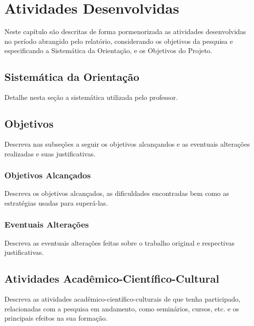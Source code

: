 \chapter{Atividades Desenvolvidas}

Neste capítulo são descritas de forma pormenorizada as atividades desenvolvidas no período abrangido pelo relatório, considerando os objetivos da pesquisa e especificando a Sistemática da Orientação, e os Objetivos do Projeto.

\section{Sistemática da Orientação}

Detalhe nesta seção a sistemática utilizada pelo professor.

\section{Objetivos}

Descreva nas subseções a seguir os objetivos alcançandos e as eventuais alterações realizadas e suas justificativas.

\subsection{Objetivos Alcançados}

Descreva os  objetivos  alcançados,  as  dificuldades  encontradas bem  como  as estratégias  usadas para superá-las.

\subsection{Eventuais Alterações}

Descreva as eventuais alterações feitas sobre o trabalho original e respectivas justificativas.

\section{Atividades Acadêmico-Científico-Cultural}

Descreva as atividades acadêmico-científico-culturais de que tenha participado, relacionadas com a pesquisa  em  andamento,  como  seminários,  cursos,  etc.  e  os principais  efeitos  na  sua formação.

